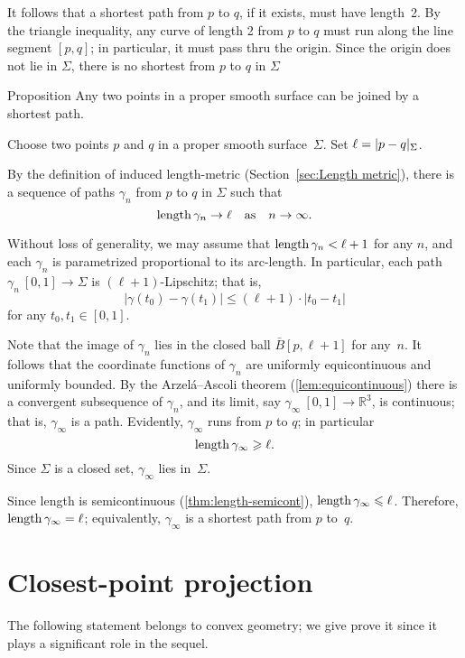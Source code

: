 It follows that a shortest path from $p$ to $q$, if it exists, must have length~2.
By the triangle inequality, any curve of length 2 from $p$ to $q$ must run along the line segment $[p,q]$;
in particular, it must pass thru the origin.
Since the origin does not lie in $\Sigma$, there is no shortest from $p$ to $q$ in $\Sigma$ 
\qeds

\begin{thm}{Proposition}\label{prop:shortest-paths-exist}
Any two points in a proper smooth surface can be joined by a shortest path. 
\end{thm}

Choose two points $p$ and $q$ in a proper smooth surface~$\Sigma$.
Set $\ell=\dist{p}{q}\Sigma$.

By the definition of induced length-metric (Section~\ref{sec:Length metric}),
there is a sequence of paths $\gamma_n$ from $p$ to $q$ in $\Sigma$ such that
\[\mathop{\rm length}\nolimits\gamma_n\to \ell\quad\text{as}\quad n\to \infty.\]

Without loss of generality, we may assume that $\mathop{\rm length}\nolimits\gamma_n<\ell+1$ for any $n$, and each $\gamma_n$ is parametrized proportional to its arc-length.
In particular, each path $\gamma_n\:[0,1]\to\Sigma$ is $(\ell+1)$-Lipschitz; 
that is,
\[|\gamma(t_0)-\gamma(t_1)|\le (\ell+1)\cdot|t_0-t_1|\]
for any $t_0,t_1\in[0,1]$.

Note that the image of $\gamma_n$ lies in the closed ball $\bar B[p,\ell+1]$ for any~$n$.
It follows that the coordinate functions of $\gamma_n$ are uniformly equicontinuous and uniformly bounded.
By the Arzel\'{a}--Ascoli theorem (\ref{lem:equicontinuous})
 there is a convergent subsequence of $\gamma_n$, and its limit, say $\gamma_\infty\:[0,1]\to\mathbb{R}^3$, is continuous;
that is, $\gamma_\infty$ is a path.
Evidently, $\gamma_\infty$ runs from $p$ to $q$;
in particular
\[\mathop{\rm length}\nolimits\gamma_\infty\geqslant \ell.\]
Since $\Sigma$ is a closed set, $\gamma_\infty$ lies in~$\Sigma$.

Since length is semicontinuous (\ref{thm:length-semicont}), $\mathop{\rm length}\nolimits\gamma_\infty\leqslant \ell$.
Therefore, $\mathop{\rm length}\nolimits\gamma_\infty= \ell$; equivalently, $\gamma_\infty$ is a shortest path from $p$ to~$q$.
\qeds

\section{Closest-point projection}

The following statement belongs to convex geometry;
we give prove it since it plays a significant role in the sequel.

